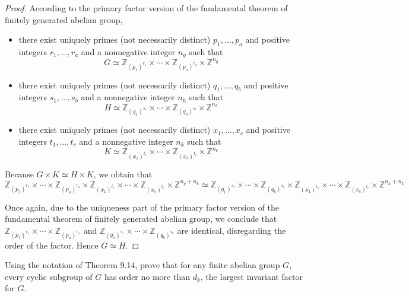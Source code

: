 \begin{proof}
    According to the primary factor version of the fundamental theorem of finitely generated abelian group,
    \begin{itemize}
        \item there exist uniquely primes (not necessarily distinct) $p_{1}, \ldots, p_{a}$ and positive integers $r_{1}, \ldots, r_{a}$ and a nonnegative integer $n_{g}$ such that
              \[
                  G \simeq \mathbb{Z}_{{(p_{1})}^{r_{1}}} \times \cdots \times \mathbb{Z}_{{(p_{a})}^{r_{a}}} \times \mathbb{Z}^{n_{g}}
              \]
        \item there exist uniquely primes (not necessarily distinct) $q_{1}, \ldots, q_{b}$ and positive integers $s_{1}, \ldots, s_{b}$ and a nonnegative integer $n_{h}$ such that
              \[
                  H \simeq \mathbb{Z}_{{(q_{1})}^{s_{1}}} \times \cdots \times \mathbb{Z}_{{(q_{b})}^{s_{b}}} \times \mathbb{Z}^{n_{h}}
              \]
        \item there exist uniquely primes (not necessarily distinct) $x_{1}, \ldots, x_{c}$ and positive integers $t_{1}, \ldots, t_{c}$ and a nonnegative integer $n_{k}$ such that
              \[
                  K \simeq \mathbb{Z}_{{(x_{1})}^{t_{1}}} \times \cdots \times \mathbb{Z}_{{(x_{c})}^{t_{c}}} \times \mathbb{Z}^{n_{k}}
              \]
    \end{itemize}

    Because $G\times K \simeq H\times K$, we obtain that
    \[
        \mathbb{Z}_{{(p_{1})}^{r_{1}}} \times \cdots \times \mathbb{Z}_{{(p_{a})}^{r_{a}}} \times \mathbb{Z}_{{(x_{1})}^{t_{1}}} \times \cdots \times \mathbb{Z}_{{(x_{c})}^{t_{c}}} \times \mathbb{Z}^{n_{g} + n_{k}}
        \simeq
        \mathbb{Z}_{{(q_{1})}^{s_{1}}} \times \cdots \times \mathbb{Z}_{{(q_{b})}^{s_{b}}} \times \mathbb{Z}_{{(x_{1})}^{t_{1}}} \times \cdots \times \mathbb{Z}_{{(x_{c})}^{t_{c}}} \times \mathbb{Z}^{n_{h} + n_{k}}
    \]

    Once again, due to the uniqueness part of the primary factor version of the fundamental theorem of finitely generated abelian group, we conclude that $\mathbb{Z}_{{(p_{1})}^{r_{1}}} \times \cdots \times \mathbb{Z}_{{(p_{a})}^{r_{a}}}$ and $\mathbb{Z}_{{(q_{1})}^{s_{1}}} \times \cdots \times \mathbb{Z}_{{(q_{b})}^{s_{b}}}$ are identical, disregarding the order of the factor. Hence $G\simeq H$.
\end{proof}

\newpage
\begin{exercise}
    Using the notation of Theorem 9.14, prove that for any finite abelian group $G$, every cyclic subgroup of $G$ has order no more than $d_{k}$, the largest invariant factor for $G$.
\end{exercise}

